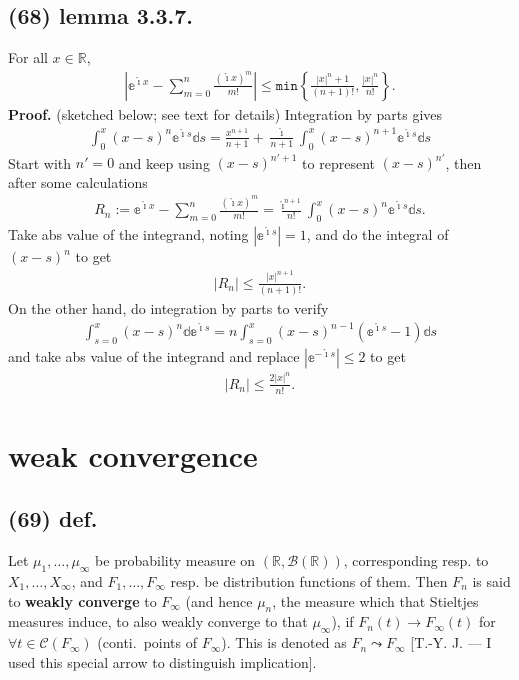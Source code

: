 \documentclass[12pt]{article}
\newcommand{\oo}\infty%
\newcommand{\F}\frac%
\newcommand{\Ev}\forall%
\newcommand{\ii}{ \mathring{\imath} }%
\newcommand{\dd}{ \BF{d} }%
\newcommand{\ee}{ \BF{e} }%
\newcommand{\Cb}[1]{ \left\{ #1 \right\} }%
\newcommand{\Nm}[1]{ \left| #1 \right| } %
\newcommand{\BF}[1]{ \mathbb{#1} }%
\newcommand{\CF}[1]{ \mathcal{#1} }%
\newcommand{\Ss}[1]{\textsf{\bfseries{#1}}}%
\newcommand{\Tw}[1]{\texttt{#1}}%
\newcommand{\EqGo}[1]{ \begin{gather*}{#1}\end{gather*} } %
\begin{document}
\subsection*{(68) lemma 3.3.7.} For all \(x \in \BF{R}\), \EqGo{
 \Nm{ \ee^{\ii x} -\sum_{m=0}^n \F{(\ii x)^m}{m!} }
 \leq \Tw{min}\Cb{ \F{|x|^n+1}{(n+1)!}, \F{|x|^n}{n!} }.
} \indent \Ss{Proof.} (sketched below; see text for details) Integration by parts gives \EqGo{
 \int_0^x (x-s)^n \ee^{\ii s} \dd s
 = \F{x^{n+1}}{n+1} + \F{\ii}{n+1} \int_0^x (x-s)^{n+1} \ee^{\ii s} \dd s
} Start with \(n' =0\) and keep using \((x-s)^{n'+1}\) to represent \((x-s)^{n'}\), then after some calculations \EqGo{
 R_n := \ee^{\ii x} -\sum_{m=0}^n \F{(\ii x)^m}{m!}
 = \F{\ii^{n+1}}{n!} \int_0^x (x-s)^n \ee^{\ii s} \dd s.
} Take abs value of the integrand, noting \(|\ee^{\ii s}| =1\), and do the integral of \((x-s)^n\) to get \EqGo{
 |R_n| \leq \F{|x|^{n+1}}{(n+1)!}.
} \indent On the other hand, do integration by parts to verify \EqGo{
 \int_{s=0}^x (x-s)^n \dd \ee^{\ii s}
 = n \int_{s=0}^x (x-s)^{n-1} (\ee^{\ii s} -1) \dd s
} and take abs value of the integrand and replace \(|\ee^{-\ii s}| \leq 2\) to get \EqGo{
 |R_n| \leq \F{2|x|^n}{n!}.
} 

\section{weak convergence}
\subsection*{(69) def.} Let \(\mu_1,\dotsc,\mu_\oo\) be probability measure on \((\BF{R}, \CF{B}(\BF{R}))\), 
corresponding resp. to \(X_1,\dotsc,X_\oo\), and \(F_1,\dotsc,F_\oo\) resp. be distribution functions of them. 
Then \(F_n\) is said to \Ss{weakly converge} to \(F_\oo\) (and hence \(\mu_n\), the measure which that Stieltjes measures induce, to also weakly converge to that \(\mu_\oo\)), if \(F_n(t) \to F_\oo(t)\) for \(\Ev t \in \CF{C}(F_\oo)\) (conti.\ points of \(F_\oo\)). 
This is denoted as \(F_n \leadsto F_\oo\) [T.-Y. J. --- I used this special arrow to distinguish implication]. 
\end{document}

